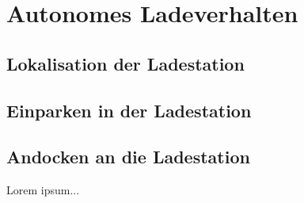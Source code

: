 \chapter{Autonomes Ladeverhalten} \label{kap:AutonomesLadeverhalten}

\section{Lokalisation der Ladestation} %

\section{Einparken in der Ladestation} %

\section{Andocken an die Ladestation} %


Lorem ipsum...
